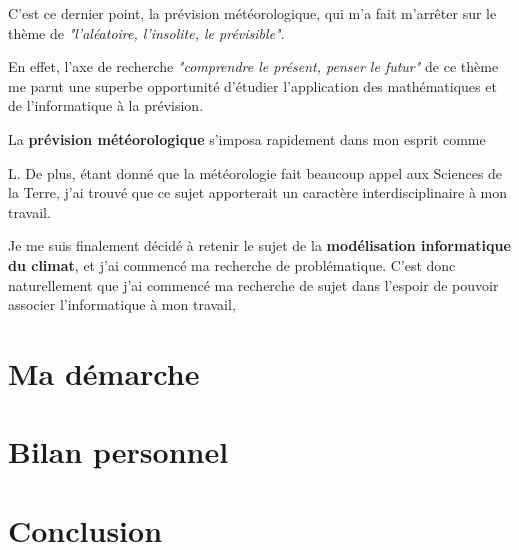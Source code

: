 \documentclass[12pt,a4paper]{article}
\begin{document}
C'est ce dernier point, la prévision météorologique, qui m'a fait m'arrêter sur le thème de \emph{"l'aléatoire, l'insolite, le prévisible"}.


En effet, l'axe de recherche \emph{"comprendre le présent, penser le futur"} de ce thème me parut une superbe opportunité d'étudier l'application des mathématiques et de l'informatique à la prévision.


La \textbf{prévision météorologique} s'imposa rapidement dans mon esprit comme 

L.
De plus, étant donné que la météorologie fait beaucoup appel aux Sciences de la Terre, j'ai trouvé que ce sujet apporterait un caractère interdisciplinaire à mon travail.

Je me suis finalement décidé à retenir le sujet de la \textbf{modélisation informatique du climat}, et j'ai commencé ma recherche de problématique.
C'est donc naturellement que j'ai commencé ma recherche de sujet dans l'espoir de pouvoir associer l'informatique à mon travail,


 
\section{Ma démarche}



\section{Bilan personnel}

\section{Conclusion}
\end{document}
